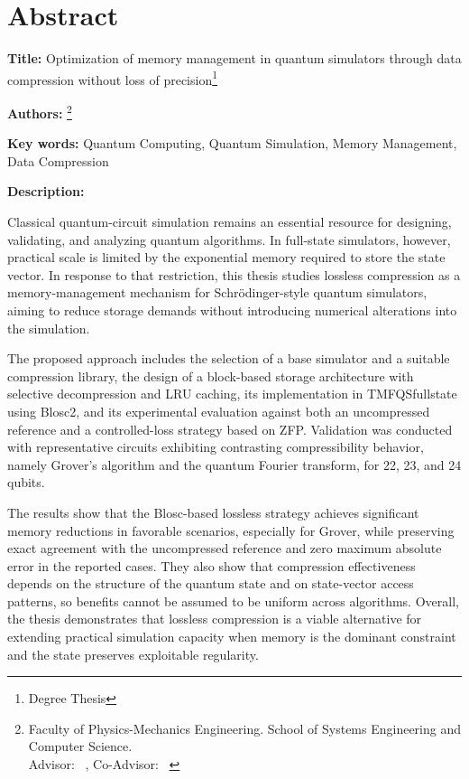 \newpage

\section*{Abstract}

\textbf{Title:} {Optimization of memory management in quantum simulators through data\\ compression without loss of precision}\footnote{Degree Thesis}

\textbf{Authors:} \nam\footnote{Faculty of Physics-Mechanics Engineering. School of Systems Engineering and Computer
Science.\\ Advisor: \tdir\ \dir, Co-Advisor: \tcdir\ \cdir }

\textbf{Key words:} { Quantum Computing, Quantum Simulation, Memory Management, Data Compression }

\textbf{Description:}

Classical quantum-circuit simulation remains an essential resource for designing, validating, and analyzing quantum algorithms. In full-state simulators, however, practical scale is limited by the exponential memory required to store the state vector. In response to that restriction, this thesis studies lossless compression as a memory-management mechanism for Schr\"odinger-style quantum simulators, aiming to reduce storage demands without introducing numerical alterations into the simulation.

The proposed approach includes the selection of a base simulator and a suitable compression library, the design of a block-based storage architecture with selective decompression and LRU caching, its implementation in TMFQSfullstate using Blosc2, and its experimental evaluation against both an uncompressed reference and a controlled-loss strategy based on ZFP. Validation was conducted with representative circuits exhibiting contrasting compressibility behavior, namely Grover's algorithm and the quantum Fourier transform, for 22, 23, and 24 qubits.

The results show that the Blosc-based lossless strategy achieves significant memory reductions in favorable scenarios, especially for Grover, while preserving exact agreement with the uncompressed reference and zero maximum absolute error in the reported cases. They also show that compression effectiveness depends on the structure of the quantum state and on state-vector access patterns, so benefits cannot be assumed to be uniform across algorithms. Overall, the thesis demonstrates that lossless compression is a viable alternative for extending practical simulation capacity when memory is the dominant constraint and the state preserves exploitable regularity.

\newpage
